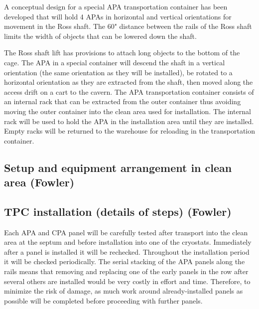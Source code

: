 A conceptual design for a special APA transportation container has been developed that will hold 4 APAs in horizontal and vertical orientations for movement in the Ross shaft. The 60" distance between the rails of the 
Ross shaft limits the width of objects that can be lowered down the shaft. 

The Ross shaft lift has provisions to attach long objects to the bottom of the cage. The APA in a special container will descend the shaft in a vertical orientation 
(the same orientation as they will be installed), be rotated to a horizontal orientation as they are extracted from the shaft, then moved along the access drift on a cart to the cavern. The APA transportation container consists of 
an internal rack that can be extracted from the outer container thus avoiding moving the outer container into the clean area used for installation. The internal rack will be used to hold the APA in the installation area until they 
are installed. Empty racks will be returned to the warehouse for reloading in the transportation container.

\subsection{Setup and equipment arrangement in clean area (Fowler)}
\label{fd:install:fsinstall:setup:cleanarea}

\subsection{TPC installation (details of steps) (Fowler)}
\label{fd:install:fsinstall:tpc:install:steps}

Each APA and CPA panel will be carefully tested after transport into the clean area at the septum and before installation into one of the cryostats. Immediately after a panel is installed it will be rechecked. Throughout the 
installation period it will be checked periodically. The serial stacking of the APA panels along the rails means that removing and replacing one of the early panels in the row after several others are installed would be 
very costly in effort and time. Therefore, to minimize the risk of damage, as much work around already-installed panels as possible will be completed before proceeding with further panels. 

